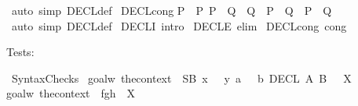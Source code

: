 \begin{isabellebody}
%
\isadelimproof
%
\endisadelimproof
%
\isatagproof
{}\isamarkupfalse%
\ {\isacharparenleft}auto\ simp{\isacharcolon}\ DECL{\isacharunderscore}def{\isacharparenright}%
\endisatagproof
{\isafoldproof}%
%
\isadelimproof
\isanewline
%
\endisadelimproof
\isanewline
{}\isamarkupfalse%
\ DECL{\isacharunderscore}cong{\isacharcolon}\isanewline
{\isachardoublequoteopen}{\isasymlbrakk}P\ {\isacharequal}\ P{\isacharprime}{\isacharsemicolon}\ P{\isacharprime}\ {\isasymLongrightarrow}\ Q\ {\isacharequal}\ Q{\isacharprime}{\isasymrbrakk}\ {\isasymLongrightarrow}\ {\isacharparenleft}P\ {\isacharbar}{\isacharminus}{\isacharminus}{\isacharminus}{\isacharminus}\ Q{\isacharparenright}\ {\isacharequal}\ {\isacharparenleft}P{\isacharprime}\ {\isacharbar}{\isacharminus}{\isacharminus}{\isacharminus}{\isacharminus}\ Q{\isacharprime}{\isacharparenright}{\isachardoublequoteclose}\isanewline
%
\isadelimproof
%
\endisadelimproof
%
\isatagproof
{}\isamarkupfalse%
\ {\isacharparenleft}auto\ simp{\isacharcolon}\ DECL{\isacharunderscore}def{\isacharparenright}%
\endisatagproof
{\isafoldproof}%
%
\isadelimproof
\isanewline
%
\endisadelimproof
\isanewline
\isanewline
{}\isamarkupfalse%
\ DECL{\isacharunderscore}I\ {\isacharbrackleft}intro{\isacharbang}{\isacharbrackright}\isanewline
{}\isamarkupfalse%
\ DECL{\isacharunderscore}E\ {\isacharbrackleft}elim{\isacharbang}{\isacharbrackright}\isanewline
{}\isamarkupfalse%
\ DECL{\isacharunderscore}cong\ {\isacharbrackleft}cong{\isacharbrackright}%
\begin{isamarkuptext}%
Tests:%
\end{isamarkuptext}%
\isamarkuptrue%
%
\isadelimML
%
\endisadelimML
%
\isatagML
{}\isamarkupfalse%
{\isacharverbatimopen}\isanewline
{\isacharparenleft}{\isacharasterisk}\ Syntax{\isacharminus}Checks{\isachardot}{\isachardot}{\isachardot}\ {\isacharasterisk}{\isacharparenright}\isanewline
goalw\ {\isacharparenleft}the{\isacharunderscore}context{\isacharparenleft}{\isacharparenright}{\isacharparenright}\ {\isacharbrackleft}{\isacharbrackright}\ {\isachardoublequote}{\isacharparenleft}SB\ x\ \ {\isachartilde}{\isachartilde}{\isachargreater}\ y{\isacharcomma}\ a\ \ {\isachartilde}{\isachartilde}{\isachargreater}\ b{\isachardot}\ DECL\ A\ B\ {\isacharparenright}\ {\isacharequal}\ {\isacharquery}X{\isachardoublequote}{\isacharsemicolon}\isanewline
goalw\ {\isacharparenleft}the{\isacharunderscore}context{\isacharparenleft}{\isacharparenright}{\isacharparenright}\ {\isacharbrackleft}{\isacharbrackright}\ {\isachardoublequote}fgh{\isacharprime}{\isacharprime}\ {\isacharequal}\ {\isacharquery}X\ {\isachardoublequote}\isanewline

\end{isabellebody}
